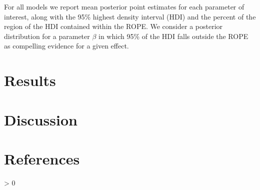 \documentclass[
  english,
  man]{apa6}
\newlength{\cslhangindent}
\newenvironment{CSLReferences}[2] %
 {%
  \setlength{\parindent}{0pt}
  \ifodd #1 \everypar{\setlength{\hangindent}{\cslhangindent}}\ignorespaces\fi
  \ifnum #2 > 0
  \setlength{\parskip}{#2\baselineskip}
  \fi
 }%
 {}
\begin{document}
For all models we report mean posterior point estimates for each parameter of interest, along with the 95\% highest density interval (HDI) and the percent of the region of the HDI contained within the ROPE. We consider a posterior distribution for a parameter \(\beta\) in which 95\% of the HDI falls outside the ROPE as compelling evidence for a given effect.

\hypertarget{results}{%
\section{Results}\label{results}}

\hypertarget{discussion}{%
\section{Discussion}\label{discussion}}

\newpage

\hypertarget{references}{%
\section{References}\label{references}}

\begingroup
\setlength{\parindent}{-0.5in}
\setlength{\leftskip}{0.5in}

\hypertarget{refs}{}
\begin{CSLReferences}{0}{0}
\end{CSLReferences}

\endgroup
\end{document}
